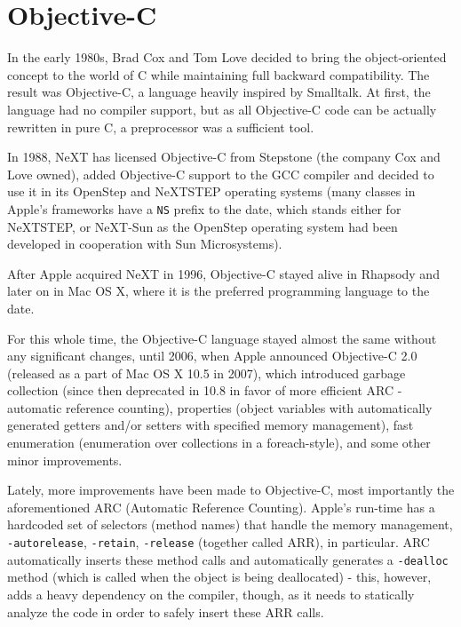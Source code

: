 \chapter{Objective-C}
  
In the early 1980s, Brad Cox and Tom Love decided to bring the object-oriented concept to the world of C while maintaining full backward compatibility. The result was Objective-C, a language heavily inspired by Smalltalk. At first, the language had no compiler support, but as all Objective-C code can be actually rewritten in pure C, a preprocessor was a sufficient tool.

In 1988, NeXT has licensed Objective-C from Stepstone (the company Cox and Love owned), added Objective-C support to the GCC compiler and decided to use it in its OpenStep and NeXTSTEP operating systems (many classes in Apple's frameworks have a \verb=NS= prefix to the date, which stands either for NeXTSTEP, or NeXT-Sun as the OpenStep operating system had been developed in cooperation with Sun Microsystems\cite{openstep_wiki}).

After Apple acquired NeXT in 1996, Objective-C stayed alive in Rhapsody\cite{rhapsody_wiki} and later on in Mac OS X, where it is the preferred programming language to the date.

For this whole time, the Objective-C language stayed almost the same without any significant changes, until 2006, when Apple announced Objective-C 2.0 (released as a part of Mac OS X 10.5 in 2007), which introduced garbage collection (since then deprecated in 10.8 in favor of more efficient ARC - automatic reference counting\cite{mountain_lion_enhancements}), properties (object variables with automatically generated getters and/or setters with specified memory management), fast enumeration (enumeration over collections in a foreach-style), and some other minor improvements.

Lately, more improvements have been made to Objective-C, most importantly the aforementioned ARC (Automatic Reference Counting). Apple's run-time has a hardcoded set of selectors (method names) that handle the memory management, \verb=-autorelease=, \verb=-retain=, \verb=-release= (together called ARR), in particular. ARC automatically inserts these method calls and automatically generates a \verb=-dealloc= method (which is called when the object is being deallocated) - this, however, adds a heavy dependency on the compiler, though, as it needs to statically analyze the code in order to safely insert these ARR calls.

